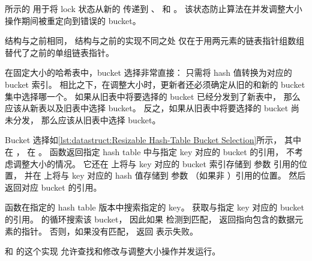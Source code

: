 \begin{fcvref}
 所示的 
用于将 lock 状态从新的 
传递到 、 和 。
该状态防止算法在并发调整大小操作期间被重定向到错误的 bucket。

 结构与之前相同， 结构与之前的实现不同之处
仅在于用两元素的链表指针组数组替代了之前的单组链表指针。

在固定大小的哈希表中，bucket 选择非常直接：
只需将 hash 值转换为对应的 bucket 索引。
相比之下，在调整大小时，更新者还必须确定从旧的和新的 bucket 集中选择哪一个。
如果从旧表中将要选择的 bucket 已经分发到了新表中，
那么应该从新表以及旧表中选择 bucket。
反之，如果从旧表中将要选择的 bucket 尚未分发，
那么应该从旧表中选择 bucket。
\end{fcvref}

\begin{listing}

\caption{可调整大小的 Hash-Table Bucket 选择}
\label{lst:datastruct:Resizable Hash-Table Bucket Selection}
\end{listing}

\begin{fcvref}
Bucket 选择如\cref{lst:datastruct:Resizable Hash-Table Bucket Selection}所示，
其中  在 ，
 在 。
 函数返回指定 hash table 中与指定 key 对应的 bucket 的引用，
不考虑调整大小的情况。
它还在  上将与 key 对应的 bucket 索引存储到
参数  引用的位置，
并在  上将与 key 对应的 hash 值存储到
参数 （如果非 ）引用的位置。
 然后返回对应 bucket 的引用。

 函数在指定的 hash table 版本中搜索指定的 key。
 获取与指定 key 对应的 bucket 的引用。
 的循环搜索该 bucket，
因此如果  检测到匹配，
 返回指向包含的数据元素的指针。
否则，如果没有匹配，
 返回  表示失败。
\end{fcvref}

\QuickQuizEnd

 和  的这个实现
允许查找和修改与调整大小操作并发运行。

